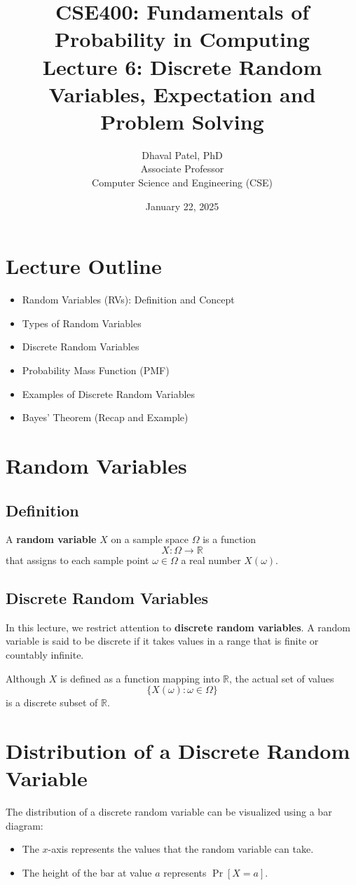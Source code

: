 \documentclass[12pt]{article}
\title{CSE400: Fundamentals of Probability in Computing\\
Lecture 6: Discrete Random Variables, Expectation and Problem Solving}
\author{Dhaval Patel, PhD\\
Associate Professor\\
Computer Science and Engineering (CSE)}
\date{January 22, 2025}
\begin{document}
\maketitle

\section*{Lecture Outline}
\begin{itemize}
    \item Random Variables (RVs): Definition and Concept
    \item Types of Random Variables
    \item Discrete Random Variables
    \item Probability Mass Function (PMF)
    \item Examples of Discrete Random Variables
    \item Bayes’ Theorem (Recap and Example)
\end{itemize}

\section{Random Variables}

\subsection{Definition}
A \textbf{random variable} $X$ on a sample space $\Omega$ is a function
\[
X : \Omega \rightarrow \mathbb{R}
\]
that assigns to each sample point $\omega \in \Omega$ a real number $X(\omega)$.

\subsection{Discrete Random Variables}
In this lecture, we restrict attention to \textbf{discrete random variables}.  
A random variable is said to be discrete if it takes values in a range that is finite or countably infinite.

Although $X$ is defined as a function mapping into $\mathbb{R}$, the actual set of values
\[
\{X(\omega) : \omega \in \Omega\}
\]
is a discrete subset of $\mathbb{R}$.

\section{Distribution of a Discrete Random Variable}

The distribution of a discrete random variable can be visualized using a bar diagram:
\begin{itemize}
    \item The $x$-axis represents the values that the random variable can take.
    \item The height of the bar at value $a$ represents $\Pr[X = a]$.
\end{itemize}
\end{document}
